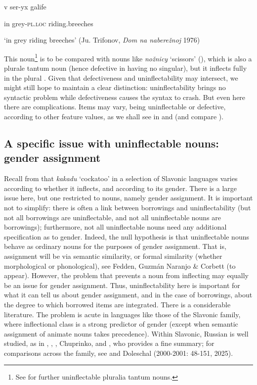 \documentclass[output=paper]{langscibook}
\begin{document}
          v  ser-yx  galife

  in  grey\textsc{{}-pl.loc}  riding.breeches

  ‘in grey riding breeches’  (Ju. Trifonov, \textit{Dom na naberežnoj} 1976)

This noun\footnote{ \textrm{See \citealt{Dunn1989} for further uninflectable pluralia tantum nouns.}} is to be compared with nouns like \textit{nožnicy} ‘scissors’ (), which is also a plurale tantum noun (hence defective in having no singular), but it inflects fully in the plural \citep[59-60]{Corbett2019}. Given that defectiveness and uninflectability may intersect, we might still hope to maintain a clear distinction: uninflectability brings no syntactic problem while defectiveness causes the syntax to crash. But even here there are complications. Items may vary, being uninflectable or defective, according to other feature values, as we shall see in  and  (and compare \citet{NikolaevBermel2022}).

\subsection{\textbf{A} \textbf{specific} \textbf{issue} \textbf{with} \textbf{uninflectable} \textbf{nouns:} \textbf{gender} \textbf{assignment}}

Recall from  that \textit{kakadu} ‘cockatoo’ in a selection of Slavonic languages varies according to whether it inflects, and according to its gender. There is a large issue here, but one restricted to nouns, namely gender assignment. It is important not to simplify: there is often a link between borrowings and uninflectability (but not all borrowings are uninflectable, and not all uninflectable nouns are borrowings); furthermore, not all uninflectable nouns need any additional specification as to gender. Indeed, the null hypothesis is that uninflectable nouns behave as ordinary nouns for the purposes of gender assignment. That is, assignment will be via semantic similarity, or formal similarity (whether morphological or phonological), see Fedden, Guzmán Naranjo \& Corbett (to appear). However, the problem that prevents a noun from inflecting may equally be an issue for gender assignment. Thus, uninflectability here is important for what it can tell us about gender assignment, and in the case of borrowings, about the degree to which borrowed items are integrated. There is a considerable literature. The problem is acute in languages like those of the Slavonic family, where inflectional class is a strong predictor of gender (except when semantic assignment of animate nouns takes precedence). Within Slavonic, Russian is well studied, as in \citet{Murphy2000}, \citet{Wang2014}, \citet{Matushansky2022}, Chuprinko, \citet{MagomedovaSlioussar2023} and \citet[148-158]{Timberlake2004}, who provides a fine summary; for comparisons across the family, see \citet[193-197]{Thomas1983} and Doleschal (2000-2001: 48-151, 2025). 
\end{document}
